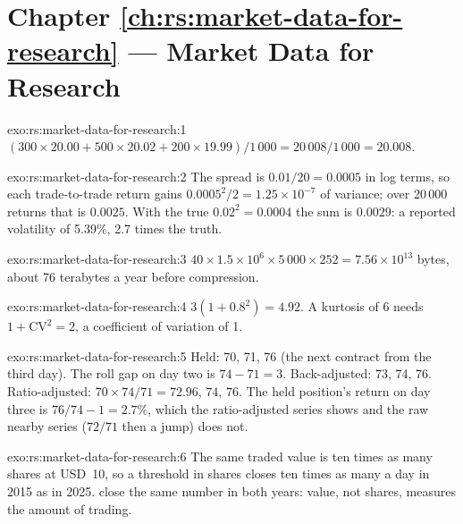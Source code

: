 \section*{Chapter \ref{ch:rs:market-data-for-research} --- Market Data for Research}

\begin{solution}{exo:rs:market-data-for-research:1}
$(300 \times 20.00 + 500 \times 20.02 + 200 \times 19.99)/1\,000 = 20\,008/1\,000 = 20.008$.
\end{solution}

\begin{solution}{exo:rs:market-data-for-research:2}
The spread is $0.01/20 = 0.0005$ in log terms, so each trade-to-trade return gains $0.0005^2/2 = 1.25 \times 10^{-7}$ of variance;
over 20\,000 returns that is $0.0025$. With the true $0.02^2 = 0.0004$ the sum is $0.0029$: a reported volatility of 5.39\%, 2.7
times the truth.
\end{solution}

\begin{solution}{exo:rs:market-data-for-research:3}
$40 \times 1.5 \times 10^6 \times 5\,000 \times 252 = 7.56 \times 10^{13}$ bytes, about 76 terabytes a year before compression.
\end{solution}

\begin{solution}{exo:rs:market-data-for-research:4}
$3(1 + 0.8^2) = 4.92$. A kurtosis of 6 needs $1 + \mathrm{CV}^2 = 2$, a coefficient of variation of 1.
\end{solution}

\begin{solution}{exo:rs:market-data-for-research:5}
Held: 70, 71, 76 (the next contract from the third day). The roll gap on day two is $74 - 71 = 3$. Back-adjusted: 73, 74, 76.
Ratio-adjusted: $70 \times 74/71 = 72.96$, $74$, $76$. The held position's return on day three is $76/74 - 1 = 2.7\%$, which the
ratio-adjusted series shows and the raw nearby series ($72/71$ then a jump) does not.
\end{solution}

\begin{solution}{exo:rs:market-data-for-research:6}
The same traded value is ten times as many shares at USD~10, so a threshold in shares closes ten times as many  a day in
2015 as in 2025.  close the same number in both years: value, not shares, measures the amount of trading.
\end{solution}


